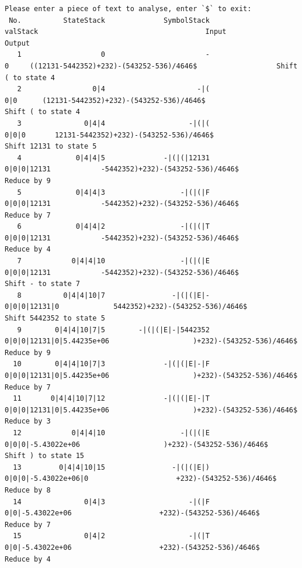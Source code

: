 \documentclass[UTF8]{ctexart}
\begin{document}
\begin{lstlisting}
Please enter a piece of text to analyse, enter `$` to exit:
 No.          StateStack              SymbolStack                           valStack                                        Input                   Output
   1                   0                        -                                  0     ((12131-5442352)+232)-(543252-536)/4646$                   Shift ( to state 4
   2                 0|4                      -|(                                0|0      (12131-5442352)+232)-(543252-536)/4646$                   Shift ( to state 4
   3               0|4|4                    -|(|(                              0|0|0       12131-5442352)+232)-(543252-536)/4646$                   Shift 12131 to state 5
   4             0|4|4|5              -|(|(|12131                        0|0|0|12131            -5442352)+232)-(543252-536)/4646$               Reduce by 9
   5             0|4|4|3                  -|(|(|F                        0|0|0|12131            -5442352)+232)-(543252-536)/4646$               Reduce by 7
   6             0|4|4|2                  -|(|(|T                        0|0|0|12131            -5442352)+232)-(543252-536)/4646$               Reduce by 4
   7            0|4|4|10                  -|(|(|E                        0|0|0|12131            -5442352)+232)-(543252-536)/4646$                   Shift - to state 7
   8          0|4|4|10|7                -|(|(|E|-                      0|0|0|12131|0             5442352)+232)-(543252-536)/4646$                   Shift 5442352 to state 5
   9        0|4|4|10|7|5        -|(|(|E|-|5442352          0|0|0|12131|0|5.44235e+06                    )+232)-(543252-536)/4646$               Reduce by 9
  10        0|4|4|10|7|3              -|(|(|E|-|F          0|0|0|12131|0|5.44235e+06                    )+232)-(543252-536)/4646$               Reduce by 7
  11       0|4|4|10|7|12              -|(|(|E|-|T          0|0|0|12131|0|5.44235e+06                    )+232)-(543252-536)/4646$               Reduce by 3
  12            0|4|4|10                  -|(|(|E                 0|0|0|-5.43022e+06                    )+232)-(543252-536)/4646$                   Shift ) to state 15
  13         0|4|4|10|15                -|(|(|E|)               0|0|0|-5.43022e+06|0                     +232)-(543252-536)/4646$               Reduce by 8
  14               0|4|3                    -|(|F                   0|0|-5.43022e+06                     +232)-(543252-536)/4646$               Reduce by 7
  15               0|4|2                    -|(|T                   0|0|-5.43022e+06                     +232)-(543252-536)/4646$               Reduce by 4

\end{lstlisting}
\end{document}
